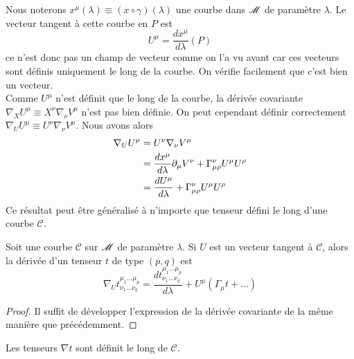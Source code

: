 \documentclass[a4paper,11pt]{report}
\begin{document}
            Nous noterons $x^\mu(\lambda)\equiv (x\circ \gamma)(\lambda)$ une courbe dans $\mathscr{M}$ de paramètre $\lambda$. Le vecteur tangent à cette courbe en $P$ est
                \begin{equation}
                    U^\mu = \frac{dx^\mu}{d\lambda}(P)
                \end{equation}
            ce n'est donc pas un champ de vecteur comme on l'a vu avant car ces vecteurs sont définis uniquement le long de la courbe. On vérifie facilement que c'est bien un vecteur.\\
            
            Comme $U^\mu$ n'est définit que le long de la courbe, la dérivée covariante $\nabla_X U^\mu\equiv X^\nu\nabla_\nu V^\mu$ n'est pas bien définie. On peut cependant définir correctement $\nabla_U U^\mu\equiv U^\nu\nabla_\nu V^\mu$. Nous avons alors
            \begin{align}
                \nabla_U U^\mu &= U^\nu\nabla_\nu V^\mu \\
                &= \frac{dx^\mu}{d\lambda}\partial_\mu V^\nu + \Gamma^\nu_{\mu\rho}U^\mu U^\rho \\
                &= \frac{dU^\mu}{d\lambda} + \Gamma^\nu_{\mu\rho} U^\mu U^\rho
            \end{align}
            Ce résultat peut être généralisé à n'importe que tenseur défini le long d'une courbe $\mathscr{C}$.
            \begin{prop}\begin{leftbar}
                Soit une courbe $\mathscr{C}$ sur $\mathscr{M}$ de paramètre $\lambda$. Si $U$ est un vecteur tangent à $\mathscr{C}$, alors la dérivée d'un tenseur $t$ de type $(p,q)$ est
                \begin{equation}
                    \nabla_U t^{\mu_1\dots\mu_p}_{\nu_1\dots\nu_q} = \frac{dt^{\mu_1\dots\mu_p}_{\nu_1\dots\nu_q}}{d\lambda} + U^\mu(\Gamma_\mu t + \dots)
                \end{equation}
            \end{leftbar}\end{prop}
            
            \begin{proof}
                Il suffit de développer l'expression de la dérivée covariante de la même manière que précédemment.
            \end{proof}
            
            Les tenseurs $\nabla t$ sont définit le long de $\mathscr{C}$.\\
            
\end{document}
